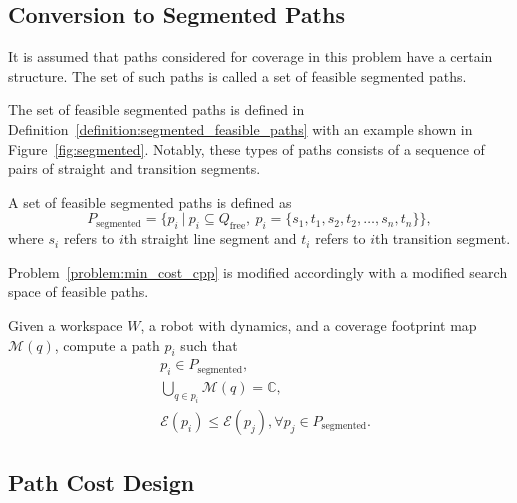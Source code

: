\documentclass[../main.tex]{subfiles}
\begin{document}
\subsection{Conversion to Segmented Paths}
\label{subsection:conversion_to_segmented}

\begin{assumption}
It is assumed that paths considered for coverage in this problem have a certain structure. The set of such paths is called a set of feasible segmented paths.
\end{assumption}

The set of feasible segmented paths is defined in Definition~\ref{definition:segmented_feasible_paths} with an example shown in Figure~\ref{fig:segmented}. Notably, these types of paths consists of a sequence of pairs of straight and transition segments.
\begin{definition}
\label{definition:segmented_feasible_paths}
A set of feasible segmented paths is defined as
	\begin{equation}
		P_{\text{segmented}}=\{p_i\ |\ p_i\subseteq Q_{\text{free}},\  p_i=\{s_1,t_1,s_2,t_2,\dots,s_n,t_n\}\},
	\end{equation}
	where $s_i$ refers to $i$th straight line segment and $t_i$ refers to $i$th transition segment.
\end{definition}

Problem~\ref{problem:min_cost_cpp} is modified accordingly with a modified search space of feasible paths.
\begin{problem}
\label{problem:min_cost_cpp_with_lines}
	Given a workspace $W$, a robot with dynamics, and a coverage footprint map $\mathcal{M}(q)$, compute a path $p_i$ such that
	\begin{equation}
	\label{condition:full_coverage_2}
	\begin{aligned}
		& p_i\in P_{\text{segmented}},\\
		& \bigcup_{q\in p_i}\mathcal{M}(q)=\mathbb{C},\\
		& \mathcal{E}(p_i)\leq\mathcal{E}(p_j), \forall p_j\in P_{\text{segmented}}.
	\end{aligned}
	\end{equation}
\end{problem}


\subsection{Path Cost Design}
\label{subsection:path_cost_design}
\end{document}
